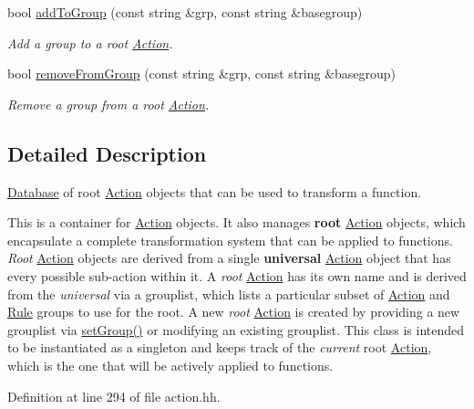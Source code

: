 \begin{DoxyCompactItemize}
$$bool \mbox{\hyperlink{class_action_database_a7b00339734448a709998615ced5cbd04}{add\+To\+Group}} (const string \&grp, const string \&basegroup)
\begin{DoxyCompactList}\small\item\em Add a group to a {\itshape root} \mbox{\hyperlink{class_action}{Action}}. \end{DoxyCompactList}\item 
bool \mbox{\hyperlink{class_action_database_af5e2e83dbc5ec8baa906081101307c74}{remove\+From\+Group}} (const string \&grp, const string \&basegroup)
\begin{DoxyCompactList}\small\item\em Remove a group from a {\itshape root} \mbox{\hyperlink{class_action}{Action}}. \end{DoxyCompactList}\end{DoxyCompactItemize}


\subsection{Detailed Description}
\mbox{\hyperlink{class_database}{Database}} of root \mbox{\hyperlink{class_action}{Action}} objects that can be used to transform a function. 

This is a container for \mbox{\hyperlink{class_action}{Action}} objects. It also manages {\bfseries{root}} \mbox{\hyperlink{class_action}{Action}} objects, which encapsulate a complete transformation system that can be applied to functions. {\itshape Root} \mbox{\hyperlink{class_action}{Action}} objects are derived from a single {\bfseries{universal}} \mbox{\hyperlink{class_action}{Action}} object that has every possible sub-\/action within it. A {\itshape root} \mbox{\hyperlink{class_action}{Action}} has its own name and is derived from the {\itshape universal} via a grouplist, which lists a particular subset of \mbox{\hyperlink{class_action}{Action}} and \mbox{\hyperlink{class_rule}{Rule}} groups to use for the root. A new {\itshape root} \mbox{\hyperlink{class_action}{Action}} is created by providing a new grouplist via \mbox{\hyperlink{class_action_database_adcd5e496a007d4d18456da556c755a42}{set\+Group()}} or modifying an existing grouplist. This class is intended to be instantiated as a singleton and keeps track of the {\itshape current} root \mbox{\hyperlink{class_action}{Action}}, which is the one that will be actively applied to functions. 

Definition at line 294 of file action.\+hh.



